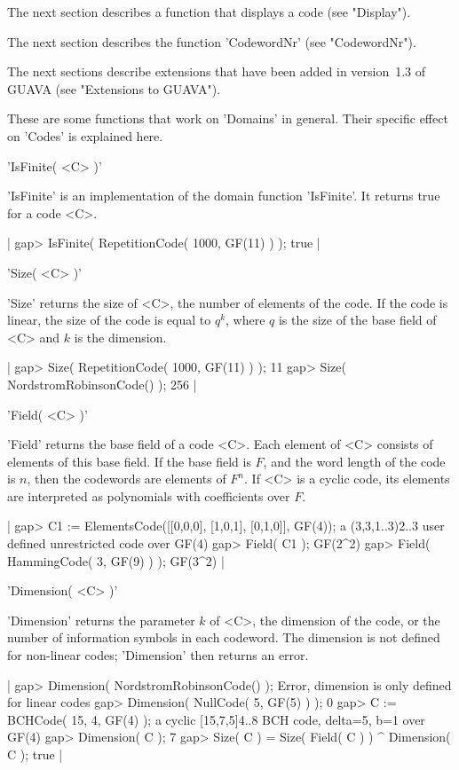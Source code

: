 The  next  section describes   a function  that   displays  a   code (see
"Display").

The next section describes the function 'CodewordNr' (see "CodewordNr").

The next sections describe extensions that have been added in version~1.3 
of GUAVA (see "Extensions to GUAVA").


These are some {\GAP} functions that work on  'Domains' in general. Their
specific effect on 'Codes' is explained here.

'IsFinite( <C> )'

'IsFinite'  is an    implementation  of   the   {\GAP} domain    function
'IsFinite'. It returns true for a code <C>.

|    gap> IsFinite( RepetitionCode( 1000, GF(11) ) );
    true |

'Size( <C> )'

'Size'  returns the size of  <C>, the number of elements  of the code. If
the code is linear, the size of the code is equal  to $q^k$, where $q$ is
the size of the base field of <C> and $k$ is the dimension.

|    gap> Size( RepetitionCode( 1000, GF(11) ) );
    11
    gap> Size( NordstromRobinsonCode() );
    256 |

'Field( <C> )'

'Field' returns  the  base field  of   a code <C>.  Each   element of <C>
consists  of elements of this base  field. If the base  field is $F$, and
the word  length of the code  is $n$, then the  codewords are elements of
$F^n$.  If <C>   is a  cyclic  code,  its  elements are   interpreted  as
polynomials with coefficients over $F$.

|    gap> C1 := ElementsCode([[0,0,0], [1,0,1], [0,1,0]], GF(4));
    a (3,3,1..3)2..3 user defined unrestricted code over GF(4)
    gap> Field( C1 );
    GF(2^2)
    gap> Field( HammingCode( 3, GF(9) ) );
    GF(3^2) |

'Dimension( <C> )'

'Dimension' returns the parameter $k$ of <C>,  the dimension of the code,
or the number  of information symbols in  each codeword. The dimension is
not defined for non-linear codes; 'Dimension' then returns an error.

|    gap> Dimension( NordstromRobinsonCode() );
    Error, dimension is only defined for linear codes
    gap> Dimension( NullCode( 5, GF(5) ) );
    0
    gap> C := BCHCode( 15, 4, GF(4) );
    a cyclic [15,7,5]4..8 BCH code, delta=5, b=1 over GF(4)
    gap> Dimension( C );
    7
    gap> Size( C ) = Size( Field( C ) ) ^ Dimension( C );
    true |


